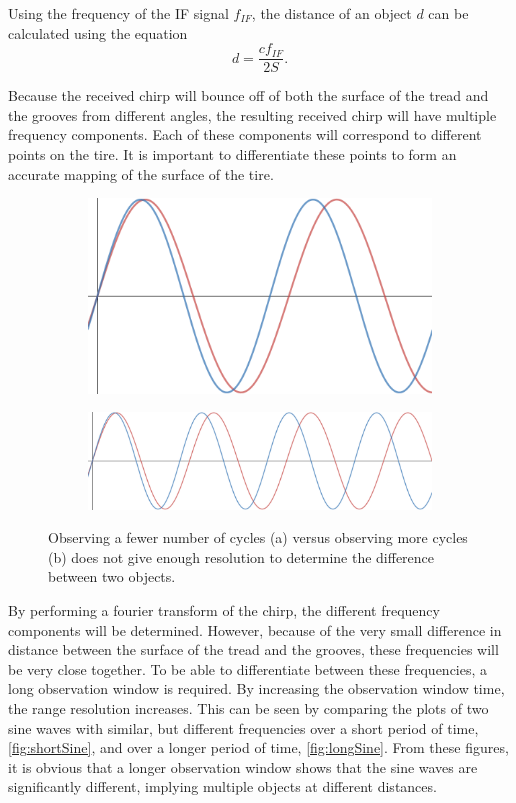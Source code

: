 \documentclass[11pt]{IEEEtran}
\begin{document}
		Using the frequency of the IF signal $f_{IF}$, the distance of an object $d$ can be calculated using the equation
		\begin{equation}
			d = \frac{cf_{IF}}{2S}.
		\end{equation}

		Because the received chirp will bounce off of both the surface of the tread and the grooves from different angles, the resulting received chirp will have multiple frequency components. Each of these components will correspond to different points on the tire. It is important to differentiate these points to form an accurate mapping of the surface of the tire. 

			\begin{figure}[tbp]
				\centering
				\begin{subfigure}[b]{\linewidth}
					\includegraphics[width=0.5\linewidth,keepaspectratio]{shortSine.png}
					\caption{}
					\label{fig:shortSine}
				\end{subfigure} %
				\begin{subfigure}[b]{\linewidth}
					\includegraphics[width=\linewidth,keepaspectratio]{longSine.png}
					\caption{}
					\label{fig:longSine}
				\end{subfigure} %
				\caption{Observing a fewer number of cycles (a) versus observing more cycles (b) does not give enough resolution to determine the difference between two objects.}
				\label{fig:LongvShortSine}
			\end{figure}%

		By performing a fourier transform of the chirp, the different frequency components will be determined. However, because of the very small difference in distance between the surface of the tread and the grooves, these frequencies will be very close together. To be able to differentiate between these frequencies, a long observation window is required. By increasing the observation window time, the range resolution increases. This can be seen by comparing the plots of two sine waves with similar, but different frequencies over a short period of time, \autoref{fig:shortSine}, and over a longer period of time, \autoref{fig:longSine}. From these figures, it is obvious that a longer observation window shows that the sine waves are significantly different, implying multiple objects at different distances.
\end{document}
